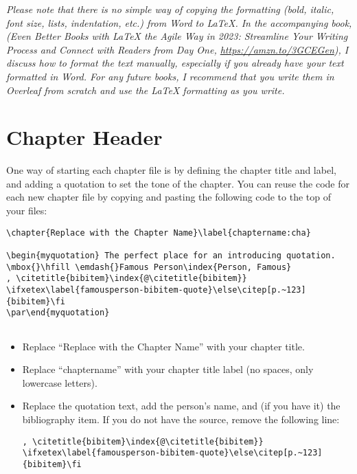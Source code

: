 \textit{Please note that there is no simple way of copying the formatting (bold, italic, font size, lists, indentation, etc.) from Word to LaTeX. In the accompanying book, (\textit{Even Better Books with LaTeX the Agile Way in 2023: Streamline Your Writing Process and Connect with Readers from Day One}, \url{https://amzn.to/3GCEGen}), I discuss how to format the text manually, especially if you already have your text formatted in Word. For any future books, I recommend that you write them in Overleaf from scratch and use the LaTeX formatting as you write.}


\section{Chapter Header}

One way of starting each chapter file is by defining the chapter title and label, and adding a quotation to set the tone of the chapter. You can reuse the code for each new chapter file by copying and pasting the following code to the top of your files:

\begin{lstlisting}
\chapter{Replace with the Chapter Name}\label{chaptername:cha}

\begin{myquotation} The perfect place for an introducing quotation.
\mbox{}\hfill \emdash{}Famous Person\index{Person, Famous}
, \citetitle{bibitem}\index{@\citetitle{bibitem}} \ifxetex\label{famousperson-bibitem-quote}\else\citep[p.~123]{bibitem}\fi
\par\end{myquotation}


\end{lstlisting}


\begin{itemize}
\item Replace ``Replace with the Chapter Name'' with your chapter title.
\item Replace ``chaptername'' with your chapter title label (no spaces, only lowercase letters).
\item Replace the quotation text, add the person's name, and (if you have it) the bibliography item. If you do not have the source, remove the following line:

\begin{lstlisting}
, \citetitle{bibitem}\index{@\citetitle{bibitem}} \ifxetex\label{famousperson-bibitem-quote}\else\citep[p.~123]{bibitem}\fi
\end{lstlisting}
\end{itemize}

